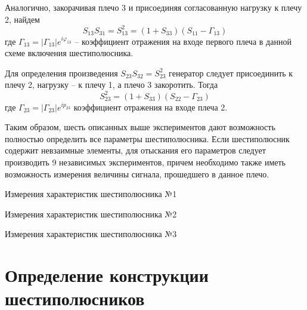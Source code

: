 \documentclass[a4paper,12pt]{article}
\begin{document}
Аналогично, закорачивая плечо 3 и присоединяя согласованную нагрузку к плечу 2, найдем 
\begin{equation}
	S _ { 13 } S _ { 31 } = S _ { 13 } ^ { 2 } = \left( 1 + S _ { 33 } \right) \left( S _ { 11 } - \Gamma _ { 13 } \right)
\end{equation}
где  $\Gamma _ { 13 } = \left| \Gamma _ { 13 } \right| e ^ { i \varphi _ { 13 } }$ -- коэффициент отражения на входе первого плеча в данной схеме включения шестиполюсника.

Для определения произведения $S_{23}S_{32}=S_{23}^2$ генератор следует
присоединить к плечу 2, нагрузку -- к плечу 1, а плечо 3 закоротить.
Тогда
\begin{equation}
	S _ { 23 } ^ { 2 } = \left( 1 + S _ { 33 } \right) \left( S _ { 22 } - \Gamma _ { 23 } \right)
\end{equation}
где $\Gamma _ { 23 } = \left| \Gamma _ { 23 } \right| e ^ { i p _ { 23 } }$ коэффициент отражения на входе плеча 2.

Таким образом, шесть описанных выше экспериментов дают возможность полностью определить все параметры  шестиполюсника.
Если шестиполюсник содержит невзаимные элементы, для отыскания его параметров следует производить 9 независимых экспериментов, причем необходимо также иметь возможность измерения величины сигнала, прошедшего в данное плечо.


\begin{table}[h!]
	\caption{Измерения характеристик шестиполюсника №1}
	\label{tab:6s1}
	\vspace{1em}
	\centering
\end{table}


\begin{table}[h!]
	\caption{Измерения характеристик шестиполюсника №2}
	\label{tab:6s2}
	\vspace{1em}
	\centering
\end{table}


\begin{table}[h!]
	\caption{Измерения характеристик шестиполюсника №3}
	\label{tab:6s3}
	\vspace{1em}
	\centering
\end{table}

\section{Определение конструкции шестиполюсников}
\end{document}
